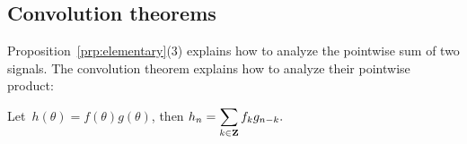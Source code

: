 



\subsection{Convolution theorems}

Proposition~\ref{prp:elementary}(3) explains how to analyze the pointwise sum
of two signals.  The convolution theorem explains how to analyze their
pointwise product:

\begin{proposition}
	Let~$h(\theta)=f(\theta)g(\theta)$, then
	\(
		\displaystyle h_n
		= \sum_{k\in\mathbf{Z}} f_kg_{n-k}.
		\)
\end{proposition}

